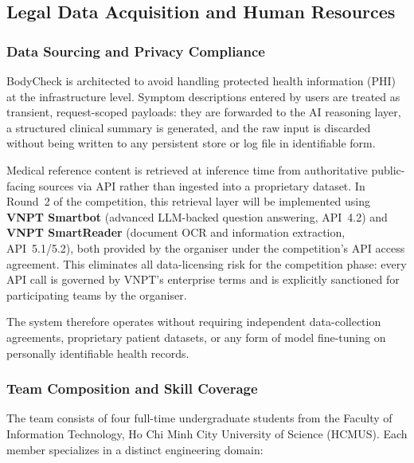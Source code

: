 \subsection{Legal Data Acquisition and Human Resources}
\label{sec:feasibility-hr}

\subsubsection*{Data Sourcing and Privacy Compliance}

BodyCheck is architected to avoid handling protected health information (PHI)
at the infrastructure level. Symptom descriptions entered by users are treated
as transient, request-scoped payloads: they are forwarded to the AI reasoning
layer, a structured clinical summary is generated, and the raw input is
discarded without being written to any persistent store or log file in
identifiable form.

Medical reference content is retrieved at inference time from authoritative
public-facing sources via API rather than ingested into a proprietary dataset.
In Round~2 of the competition, this retrieval layer will be implemented using
\textbf{VNPT Smartbot} (advanced LLM-backed question answering, API~4.2) and
\textbf{VNPT SmartReader} (document OCR and information extraction, API~5.1/5.2),
both provided by the organiser under the competition's API access agreement.
This eliminates all data-licensing risk for the competition phase: every API
call is governed by VNPT's enterprise terms and is explicitly sanctioned for
participating teams by the organiser.

The system therefore operates without requiring independent data-collection
agreements, proprietary patient datasets, or any form of model fine-tuning on
personally identifiable health records.

\subsubsection*{Team Composition and Skill Coverage}

The team consists of four full-time undergraduate students from the
Faculty of Information Technology, Ho Chi Minh City University of Science
(HCMUS). Each member specializes in a distinct engineering
domain:

